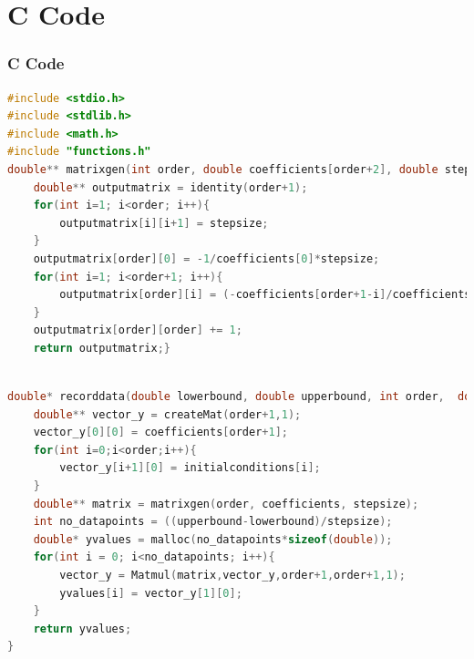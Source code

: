 \documentclass{beamer}
\theoremstyle{remark}
\numberwithin{equation}{section}
\begin{document}
\section{C Code}
\begin{frame}[fragile]
\frametitle{C Code}
\begin{lstlisting}[language=C]
#include <stdio.h>
#include <stdlib.h>
#include <math.h>
#include "functions.h"
double** matrixgen(int order, double coefficients[order+2], double stepsize){
	double** outputmatrix = identity(order+1);
	for(int i=1; i<order; i++){
		outputmatrix[i][i+1] = stepsize;
	}
	outputmatrix[order][0] = -1/coefficients[0]*stepsize;
	for(int i=1; i<order+1; i++){
		outputmatrix[order][i] = (-coefficients[order+1-i]/coefficients[0])*stepsize;
	}
	outputmatrix[order][order] += 1; 
	return outputmatrix;}

\end{lstlisting}
\end{frame}
\begin{frame}[fragile]
\begin{lstlisting}[language=C]

double* recorddata(double lowerbound, double upperbound, int order,  double coefficients[order+2], double initialconditions[order], double stepsize){
	double** vector_y = createMat(order+1,1);
	vector_y[0][0] = coefficients[order+1];
	for(int i=0;i<order;i++){
		vector_y[i+1][0] = initialconditions[i];
	}
	double** matrix = matrixgen(order, coefficients, stepsize);
	int no_datapoints = ((upperbound-lowerbound)/stepsize);
	double* yvalues = malloc(no_datapoints*sizeof(double));
	for(int i = 0; i<no_datapoints; i++){
		vector_y = Matmul(matrix,vector_y,order+1,order+1,1);
		yvalues[i] = vector_y[1][0];
	}
	return yvalues;
}


\end{lstlisting}
\end{frame}
\end{document}

